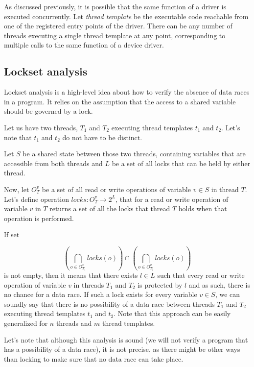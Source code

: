 \documentclass[..thesis.tex]{subfiles}
\begin{document}
As discussed previously, it is possible that the same function of a driver is executed concurrently. Let \textit{thread template}  be the executable code reachable from one of the registered entry points of the driver. There can be any number of threads executing a single thread template at any point, corresponding to multiple calls to the same function of a device driver.

\subsection{Lockset analysis}

Lockset analysis is a high-level idea about how to verify the absence of data races in a program. It relies on the assumption that the access to a shared variable should be governed by a lock. 

Let us have two threads, $T_1$ and $T_2$ executing thread templates $t_1$ and $t_2$. Let's note that $t_1$ and $t_2$ do not have to be distinct.

Let $S$ be a shared state between those two threads, containing variables that are accessible from both threads and $L$ be a set of all locks that can be held by either thread.

Now, let $O_{T}^v$ be a set of all read or write operations of variable $v \in S$ in thread $T$. Let's define operation $locks : O_{T}^v \to 2^L$, that for a read or write operation of variable $v$ in $T$ returns a set of all the locks that thread $T$ holds when that operation is performed.

If set

\begin{equation*}
\left( \bigcap \limits_{o \in O_{T_1}^v} locks \left(o \right) \right) \cap  \left( \bigcap \limits_{o \in O_{T_2}^v} locks \left(o \right) \right)
\end{equation*}
 is not empty, then it means that there exists $l \in L$ such that every read or write operation of variable $v$ in threads $T_1$ and $T_2$ is protected by $l$ and as such, there is no chance for a data race. If such a lock exists for every variable $v \in S$, we can soundly say that there is no possibility of a data race between threads $T_1$ and $T_2$ executing thread templates $t_1$ and $t_2$. Note that this approach can be easily generalized for $n$ threads and $m$ thread templates.

Let's note that although this analysis is sound (we will not verify a program that has a possibility of a data race), it is not precise, as there might be other ways than locking to make sure that no data race can take place.
\end{document}
